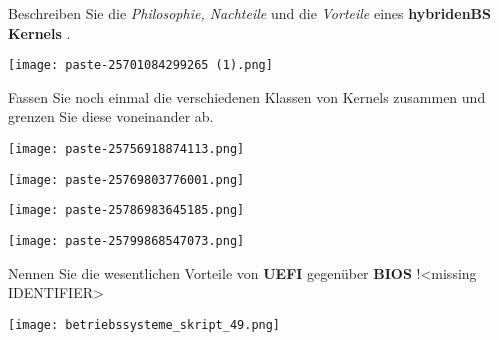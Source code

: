 \documentclass{article}
\begin{document}
\begin{tcolorbox}[colback=white!10!white,colframe=lightgray!75!black,
  savelowerto=\jobname_ex.tex,breakable,enhanced,lines before break=40]

\begin{center}
Beschreiben Sie die
\textit{Philosophie, Nachteile
}und die
\textit{Vorteile
}eines 
\textbf{hybridenBS Kernels
}.

\end{center}

\tcblower

\justifying
\begin{center}
\texttt{[image: paste-25701084299265 (1).png]}
\end{center}

\end{tcolorbox}
\begin{tcolorbox}[colback=white!10!white,colframe=lightgray!75!black,
  savelowerto=\jobname_ex.tex,breakable,enhanced,lines before break=40]

\begin{center}
Fassen Sie noch einmal die verschiedenen Klassen von Kernels zusammen und grenzen Sie diese voneinander ab.

\end{center}

\tcblower

\justifying
\begin{center}
\texttt{[image: paste-25756918874113.png]}
\end{center}
\begin{center}
\texttt{[image: paste-25769803776001.png]}
\end{center}
\begin{center}
\texttt{[image: paste-25786983645185.png]}
\end{center}
\begin{center}
\texttt{[image: paste-25799868547073.png]}
\end{center}

\end{tcolorbox}
\begin{tcolorbox}[colback=white!10!white,colframe=lightgray!75!black,
  savelowerto=\jobname_ex.tex,breakable,enhanced,lines before break=40]

\begin{center}
Nennen Sie die wesentlichen Vorteile von 
\textbf{UEFI
} gegenüber 
\textbf{BIOS
}!<missing IDENTIFIER>

\end{center}

\tcblower

\justifying
\begin{center}
\texttt{[image: betriebssysteme\_skript\_49.png]}
\end{center}

\end{tcolorbox}
\end{document}
